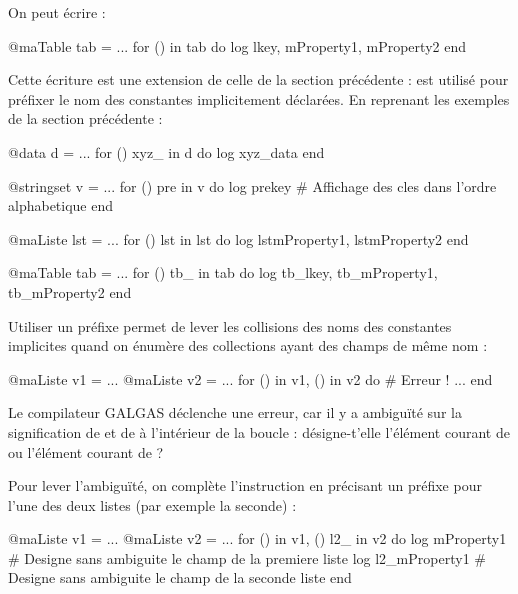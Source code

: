 {On peut écrire :

\begin{galgascode}
@maTable tab = ...
for () in tab do
  log lkey, mProperty1, mProperty2
end
\end{galgascode}



Cette écriture est une extension de celle de la section précédente :  est utilisé pour préfixer le nom des constantes implicitement déclarées. En reprenant les exemples de la section précédente :

\begin{galgascode}
@data d = ...
for () xyz_ in d do
  log xyz_data
end
\end{galgascode}



\begin{galgascode}
@stringset v = ...
for () pre in v do
  log prekey # Affichage des cles dans l'ordre alphabetique
end
\end{galgascode}


\begin{galgascode}
@maListe lst = ...
for () lst in lst do
  log lstmProperty1, lstmProperty2
end
\end{galgascode}


\begin{galgascode}
@maTable tab = ...
for () tb_ in tab do
  log tb_lkey, tb_mProperty1, tb_mProperty2
end
\end{galgascode}

Utiliser un préfixe permet de lever les collisions des noms des constantes implicites quand on énumère des collections ayant des champs de même nom :

\begin{galgascode}
@maListe v1 = ...
@maListe v2 = ...
for () in v1, () in v2 do # Erreur !
 ...
end
\end{galgascode}

Le compilateur GALGAS déclenche une erreur, car il y a ambiguïté sur la signification de  et de  à l'intérieur de la boucle : désigne-t'elle l'élément courant de  ou l'élément courant de  ?

Pour lever l'ambiguïté, on complète l'instruction en précisant un préfixe pour l'une des deux listes (par exemple la seconde) :
\begin{galgascode}
@maListe v1 = ...
@maListe v2 = ...
for () in v1, () l2_ in v2 do
  log mProperty1 # Designe sans ambiguite le champ de la premiere liste
  log l2_mProperty1 # Designe sans ambiguite le champ de la seconde liste
end
\end{galgascode}


}
